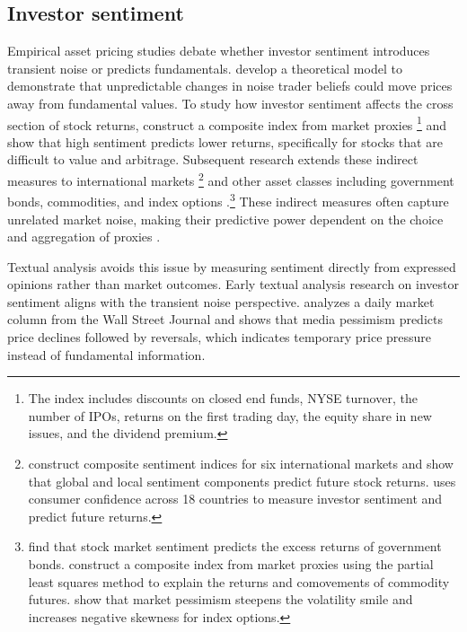 \documentclass[12pt]{article}
\begin{document}
\subsection{Investor sentiment}


Empirical asset pricing studies debate whether investor sentiment introduces transient noise or predicts fundamentals. \citet{delong1990noise} develop a theoretical model to demonstrate that unpredictable changes in noise trader beliefs could move prices away from fundamental values. To study how investor sentiment affects the cross section of stock returns, \citet{baker2006} construct a composite index from market proxies \footnote{The index includes discounts on closed end funds, NYSE turnover, the number of IPOs, returns on the first trading day, the equity share in new issues, and the dividend premium.} and show that high sentiment predicts lower returns, specifically for stocks that are difficult to value and arbitrage. Subsequent research extends these indirect measures to international markets \citep{baker2012global,schmeling2009} \footnote{\citet{baker2012global} construct composite sentiment indices for six international markets and show that global and local sentiment components predict future stock returns. \citet{schmeling2009} uses consumer confidence across 18 countries to measure investor sentiment and predict future returns.} and other asset classes including government bonds, commodities, and index options \citep{baker2012bonds,gao2015,han2008}.\footnote{\citet{baker2012bonds} find that stock market sentiment predicts the excess returns of government bonds. \citet{gao2015} construct a composite index from market proxies using the partial least squares method to explain the returns and comovements of commodity futures. \citet{han2008} show that market pessimism steepens the volatility smile and increases negative skewness for index options.} These indirect measures often capture unrelated market noise, making their predictive power dependent on the choice and aggregation of proxies \citep{huang2015}.

Textual analysis avoids this issue by measuring sentiment directly from expressed opinions rather than market outcomes. Early textual analysis research on investor sentiment aligns with the transient noise perspective. \citet{tetlock2007giving} analyzes a daily market column from the Wall Street Journal and shows that media pessimism predicts price declines followed by reversals, which indicates temporary price pressure instead of fundamental information.
\end{document}
